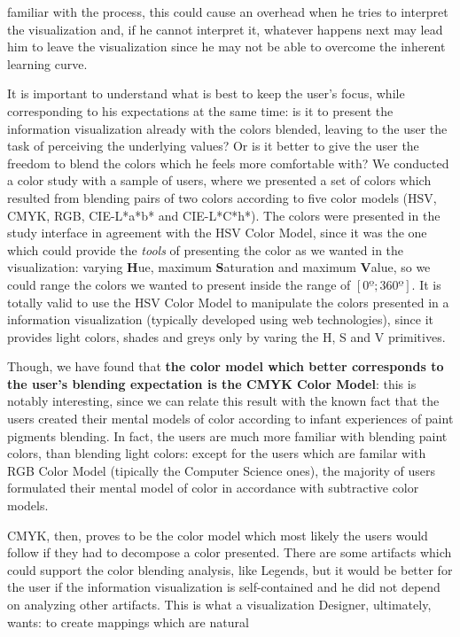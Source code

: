 familiar with the process, this could cause an overhead when he tries to interpret the visualization and, if he cannot interpret it, whatever
happens next may lead him to leave the visualization since he may not be able to overcome the inherent learning curve. \par
%
It is important to understand what is best to keep the user's focus, while corresponding to his expectations at the same time: is it to present the
information visualization already with the colors blended, leaving to the user the task of perceiving the underlying values? Or is it better to give
the user the freedom to blend the colors which he feels more comfortable with? We conducted a color study with a sample of users, where we presented
a set of colors which resulted from blending pairs of two colors according to five color models (HSV, CMYK, RGB, CIE-L*a*b* and CIE-L*C*h*). The colors
were presented in the study interface in agreement with the HSV Color Model, since it was the one which could provide the \emph{tools} of presenting the
color as we wanted in the visualization: varying \textbf{H}ue, maximum \textbf{S}aturation and maximum \textbf{V}alue, so we could range the colors we
wanted to present inside the range of $[0º ; 360º]$. It is totally valid to use the HSV Color Model to manipulate the colors presented in a information
visualization (typically developed using web technologies), since it provides light colors, shades and greys only by varing the H, S and V primitives. \par
%
Though, we have found that \textbf{the color model which better corresponds to the user's blending expectation is the CMYK Color Model}: this is
notably interesting, since we can relate this result with the known fact that the users created their mental models of color according to infant
experiences of paint pigments blending. In fact, the users are much more familiar with blending paint colors, than blending light colors: except
for the users which are familar with RGB Color Model (tipically the Computer Science ones), the majority of users formulated their mental model of
color in accordance with subtractive color models. \par
%
CMYK, then, proves to be the color model which most likely the users would follow if they had to decompose a color presented. There are some artifacts
which could support the color blending analysis, like Legends, but it would be better for the user if the information visualization is self-contained
and he did not depend on analyzing other artifacts. This is what a visualization Designer, ultimately, wants: to create mappings which are natural
